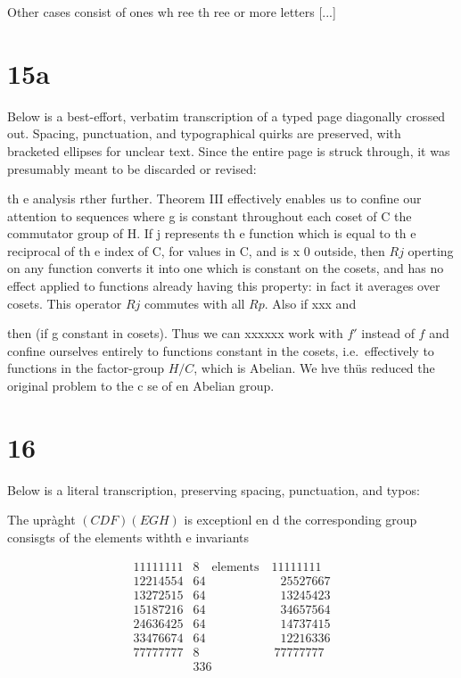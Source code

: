 \documentclass[12pt]{article}
\begin{document}
Other cases consist of ones wh ree th ree or more letters [...]

\section{15a}

Below is a best-effort, verbatim transcription of a typed page diagonally crossed out. 
Spacing, punctuation, and typographical quirks are preserved, with bracketed ellipses for unclear text. 
Since the entire page is struck through, it was presumably meant to be discarded or revised:

\bigskip

th e analysis rther further. Theorem III effectively enables
us to confine our attention to sequences
where g is constant throughout each coset of C the commutator
group of H. If j represents th e function which is equal to
th e reciprocal of th e index of C, for values in C, and is x
0 outside, then \(Rj\) operting on any function converts it into
one which is constant on the cosets, and has no effect applied
to functions already having this property: in fact it averages
over cosets. This operator \(Rj\) commutes with all \(Rp\). Also if
xxx and

then
(if g constant in cosets). Thus we can xxxxxx work with \(f'\)
instead of \(f\) and confine ourselves entirely to functions
constant in the cosets, i.e.\ effectively to functions
in the factor-group \(H/C\), which is Abelian. We hve thüs
reduced the original problem to the c se of en Abelian group.

\section{16}

Below is a literal transcription, preserving spacing, punctuation, and typos:

\bigskip

\noindent
The upr\`{a}ght \((CDF)(EGH)\) is exceptionl en d the corresponding
group consisgts of the elements withth e invariants

\[
\begin{array}{ll}
11111111 & 8 \quad \text{elements} \quad 11111111 \\
12214554 & 64 \quad\qquad\qquad\quad 25527667 \\
13272515 & 64 \quad\qquad\qquad\quad 13245423 \\
15187216 & 64 \quad\qquad\qquad\quad 34657564 \\
24636425 & 64 \quad\qquad\qquad\quad 14737415 \\
33476674 & 64 \quad\qquad\qquad\quad 12216336 \\
77777777 & 8  \quad\qquad\qquad\quad 77777777 \\
         & 336
\end{array}
\]
\end{document}
